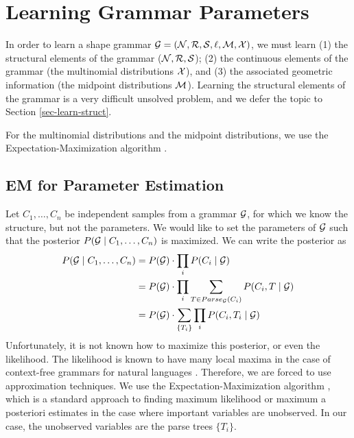 \documentclass{article}
\begin{document}

\section{Learning Grammar Parameters}

In order to learn a shape grammar ${\mathcal G} =
({\mathcal N},{\mathcal R},{\mathcal S},\ell,{\mathcal M},{\mathcal X})$, we must learn (1) the structural
elements of the grammar (${\mathcal N}, {\mathcal R}, {\mathcal S}$); (2) the continuous
elements of the grammar (the multinomial distributions ${\mathcal X}$), and
(3) the associated geometric information (the midpoint distributions
${\mathcal M}$). Learning the structural elements of the grammar is a very
difficult unsolved problem, and we defer the topic to Section
\ref{sec-learn-struct}.

For the multinomial distributions and the midpoint distributions, we
use the Expectation-Maximization algorithm \cite{em}.  

\subsection{EM for Parameter Estimation}

Let $C_1,\dots, C_n$ be independent samples from a grammar ${\mathcal G}$, for
which we know the structure, but not the parameters. We would like to
set the parameters of ${\mathcal G}$ such that the posterior $P({\mathcal G}\mid
C_1,\dots,C_n)$ is maximized. We can write the posterior as
\begin{align*}
  P({\mathcal G}\mid C_1,\dots, C_n) &= P({\mathcal G}) \cdot \prod_i P(C_i\mid {\mathcal G})\\
  &= P({\mathcal G}) \cdot \prod_i \sum_{T\in Parse_{{\mathcal G}}(C_i)}P(C_i, T \mid {\mathcal G})\\
  &= P({\mathcal G}) \cdot \sum_{\{T_i\}}\prod_i P(C_i, T_i \mid {\mathcal G})\\
\end{align*}
Unfortunately, it is not known how to maximize this posterior, or even
the likelihood. The likelihood is known to have many local maxima in
the case of context-free grammars for natural languages
\cite{charniak}. Therefore, we are forced to use approximation
techniques. We use the Expectation-Maximization algorithm \cite{em},
which is a standard approach to finding maximum likelihood or maximum
a posteriori estimates in the case where important variables are
unobserved. In our case, the unobserved variables are the parse trees
$\{T_i\}$.
\end{document}
